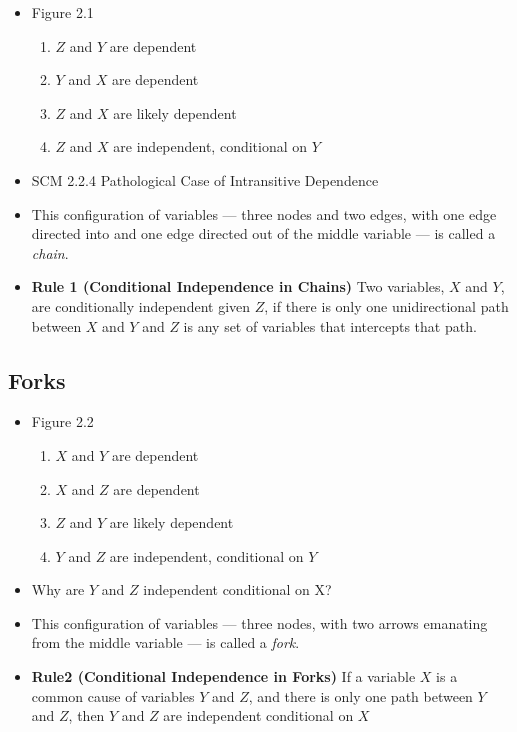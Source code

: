 \documentclass[]{article}
\providecommand{\tightlist}{%
  \setlength{\itemsep}{0pt}\setlength{\parskip}{0pt}}
\begin{document}
\begin{itemize}
\item
  Figure 2.1

  \begin{enumerate}
  \def\labelenumi{\arabic{enumi}.}
  \tightlist
  \item
    \(Z\) and \(Y\) are dependent
  \item
    \(Y\) and \(X\) are dependent
  \item
    \(Z\) and \(X\) are likely dependent
  \item
    \(Z\) and \(X\) are independent, conditional on \(Y\)
  \end{enumerate}
\item
  SCM 2.2.4 Pathological Case of Intransitive Dependence
\item
  This configuration of variables --- three nodes and two edges, with
  one edge directed into and one edge directed out of the middle
  variable --- is called a \emph{chain}.
\item
  \textbf{Rule 1 (Conditional Independence in Chains)} Two variables,
  \(X\) and \(Y\), are conditionally independent given \(Z\), if there
  is only one unidirectional path between \(X\) and \(Y\) and \(Z\) is
  any set of variables that intercepts that path.
\end{itemize}

\subsection{Forks}\label{forks}

\begin{itemize}
\item
  Figure 2.2

  \begin{enumerate}
  \def\labelenumi{\arabic{enumi}.}
  \tightlist
  \item
    \(X\) and \(Y\) are dependent
  \item
    \(X\) and \(Z\) are dependent
  \item
    \(Z\) and \(Y\) are likely dependent
  \item
    \(Y\) and \(Z\) are independent, conditional on \(Y\)
  \end{enumerate}
\item
  Why are \(Y\) and \(Z\) independent conditional on X?
\item
  This configuration of variables --- three nodes, with two arrows
  emanating from the middle variable --- is called a \emph{fork}.
\item
  \textbf{Rule2 (Conditional Independence in Forks)} If a variable \(X\)
  is a common cause of variables \(Y\) and \(Z\), and there is only one
  path between \(Y\) and \(Z\), then \(Y\) and \(Z\) are independent
  conditional on \(X\)
\end{itemize}
\end{document}
